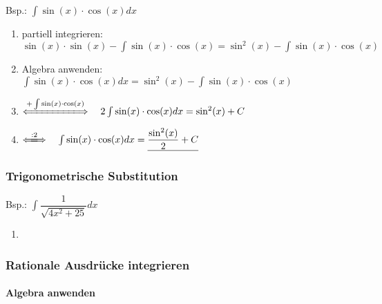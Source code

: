 				\begin{minipage}[c]{.2\textwidth}
					Bsp.: $ \int \sin(x) \cdot \cos(x) dx $
				\end{minipage}
				\begin{minipage}{.8\textwidth}
					\begin{enumerate}
						\item partiell integrieren: \quad $\sin(x) \cdot \sin(x) - \int \sin(x) \cdot \cos(x) = \sin^2(x) - \int \sin(x) \cdot \cos(x)$
						\item Algebra anwenden: \quad $ \int \sin(x) \cdot \cos(x) dx = \sin^2(x) - \int \sin(x) \cdot \cos(x)$ 
						\item[] \qquad $\xLongleftrightarrow{+\int\sin(x) \cdot \cos(x)} \quad 2\int \sin(x) \cdot \cos(x) dx = \sin^2(x)+C $
						\item[] \qquad \qquad \qquad $\xLongleftrightarrow{:2} \quad \int \sin(x) \cdot \cos(x) dx = \underline{\dfrac{\sin^2(x)}{2} + C}$
					\end{enumerate}				
				\end{minipage}
		
		\subsubsection{Trigonometrische Substitution}
			\begin{minipage}[c]{.2\textwidth}
				Bsp.: $ \int \dfrac{1}{\sqrt{4x^2+25}} dx $
			\end{minipage}
			\begin{minipage}{.8\textwidth}
				\begin{enumerate}
					\item 
				\end{enumerate}				
			\end{minipage}
		
		\subsubsection{Rationale Ausdrücke integrieren}
			\paragraph{Algebra anwenden}\
			

